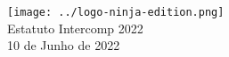 \begin{center}

	\vspace*{\fill}
	{\let\clearpage\relax \texttt{[image: ../logo-ninja-edition.png]} \\ [.5cm]}
	\Huge{Estatuto Intercomp 2022} \\ [.5cm]
	\normalsize{10 de Junho de 2022}
	\vspace*{\fill}

\end{center}

